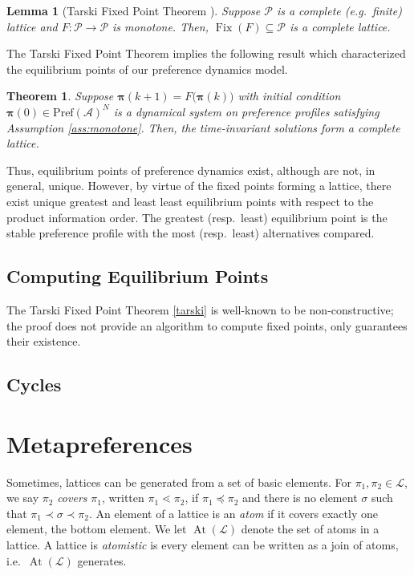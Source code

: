 \documentclass[conference]{ieeeconf}
\newcommand{\A}{\mathcal{A}}
\renewcommand{\P}{\mathcal{P}}
\newcommand{\Pref}{\mathrm{Pref}}
\renewcommand{\L}{\mathcal{L}}
\DeclareMathOperator{\Atoms}{At}
\DeclareMathOperator{\Fix}{Fix}
\newtheorem{theorem}{Theorem}
\newtheorem{lemma}{Lemma}
\begin{document}
\begin{lemma}[Tarski Fixed Point Theorem \cite{tarski}] \label{thm:tfpt}
    Suppose $\P$ is a complete (e.g.~finite) lattice and $F: \P \to \P$ is monotone. Then, $\Fix(F) \subseteq \P$ is a complete lattice.
\end{lemma}

The Tarski Fixed Point Theorem implies the following result which characterized the equilibrium points of our preference dynamics model.

\begin{theorem}
    Suppose $\boldsymbol{\pi}(k+1) = F \bigl( \boldsymbol{\pi}(k) \bigr)$ with initial condition $\boldsymbol{\pi}(0) \in \Pref(\A)^N$ is a dynamical system on preference profiles satisfying Assumption \ref{ass:monotone}. Then, the time-invariant solutions
    form a complete lattice.
\end{theorem}

Thus, equilibrium points of preference dynamics exist, although are not, in general, unique. However, by virtue of the fixed points forming a lattice, there exist unique greatest and least least equilibrium points with respect to the product information order. The greatest (resp.~least) equilibrium point is the stable preference profile with the most (resp.~least) alternatives compared.


\subsection{Computing Equilibrium Points}

The Tarski Fixed Point Theorem \ref{tarski} is well-known to be non-constructive; the proof does not provide an algorithm to compute fixed points, only guarantees their existence.


\subsection{Cycles}





\section{Metapreferences}

Sometimes, lattices can be generated from a set of basic elements. For $\pi_1, \pi_2 \in \L$, we say $\pi_2$ \emph{covers} $\pi_1$, written $\pi_1 \lessdot \pi_2$, if $\pi_1 \preceq \pi_2$ and there is no element $\sigma$ such that $\pi_1 \prec \sigma \prec \pi_2$. An element of a lattice is an \emph{atom} if it covers exactly one element, the bottom element. We let $\Atoms(\L)$ denote the set of atoms in a lattice. A lattice is \emph{atomistic} is every element can be written as a join of atoms, i.e.~$\Atoms(\L)$ generates.
\end{document}
